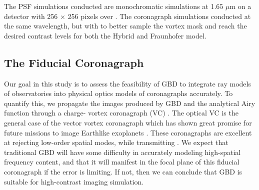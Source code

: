  The PSF simulations conducted  are monochromatic simulations at 1.65 $\mu$m on a detector with 256 $\times$ 256 pixels over . The coronagraph simulations  conducted at the same wavelength, but with  to better sample the vortex mask and reach the desired contrast levels for both the Hybrid and Fraunhofer model.

\subsection{The Fiducial Coronagraph}
Our goal in this study is to assess the feasibility of GBD to integrate ray models of observatories into physical optics models of coronagraphs accurately. To quantify this, we propagate the images produced by GBD and the analytical Airy function through a charge- vortex coronagraph (VC) \cite{mawet_annular_2005,lee_experimental_2006}. The optical VC is the general case of the vector vortex coronagraph\cite{mawet_vector_2010} which has shown great promise for future missions to image Earthlike exoplanets \cite{serabyn_vector_2019-1}. These coronagraphs are excellent at rejecting low-order spatial modes, while transmitting . We expect that traditional GBD will have some difficulty in accurately modeling high-spatial frequency content, and that it will manifest in the focal plane of this fiducial coronagraph if the error is limiting. If not, then we can conclude that GBD is suitable for high-contrast imaging simulation.

